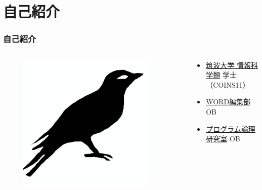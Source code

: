 





\newcommand\ballref[1]{%
\tikz \node[circle, shade,ball color=structure.fg,inner sep=0pt,%
  text width=8pt,font=\tiny,align=center] {\color{white}\ref{#1}};
}




\frame{\maketitle}

\section{自己紹介}
\begin{frame}[fragile]
  \frametitle{自己紹介}
  
  \begin{columns}
    \begin{column}{0.4\textwidth}
      \centering
      \begin{figure}
        \includegraphics[width=0.9\textwidth]{img/bird2x.png}
      \end{figure}
    \end{column}
    \begin{column}{0.6\textwidth}
      \begin{itemize}
        \item<2-> \href{https://www.coins.tsukuba.ac.jp/}{筑波大学 情報科学類} 学士（COINS11）
        \item<3-> \href{http://www.word-ac.net/}{WORD編集部} OB
        \item<4-> \href{http://logic.cs.tsukuba.ac.jp/index-j.html}{プログラム論理研究室} OB
      \end{itemize}
    \end{column}
  \end{columns}
\end{frame}

